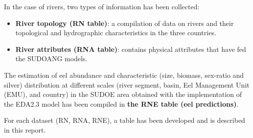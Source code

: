 \documentclass[pdftex,12pt,a4paper,svgnames]{report}\usepackage[]{graphicx}\usepackage[]{color}
\begin{document}
In the case of rivers, two types of information has been collected: 
\begin{itemize}
\item \textbf{River topology (RN table)}: a compilation of data on rivers and
their topological and hydrographic characteristics in the three countries.
\item \textbf{River attributes (RNA table)}: contains physical attributes that
have fed the SUDOANG models.
\end{itemize}

The estimation of eel abundance and characteristic (size, biomass, sex-ratio and
silver) distribution at different scales (river segment, basin, Eel Management Unit
(EMU), and country) in the SUDOE area obtained with the implementation of the
EDA2.3 model has been compiled in \textbf{the RNE table (eel predictions)}.

For each dataset (RN, RNA, RNE), a table has been developed and is
described in this report.

\clearpage
\end{document}
